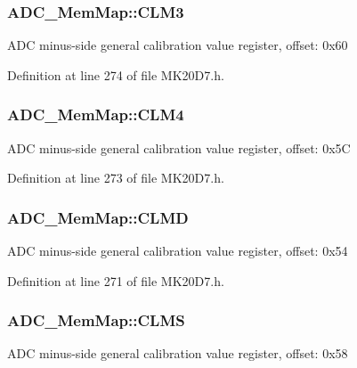 \subsubsection[{\texorpdfstring{C\+L\+M3}{CLM3}}]{ A\+D\+C\+\_\+\+Mem\+Map\+::\+C\+L\+M3}\hypertarget{struct_a_d_c___mem_map_a326c171566746f11f9b808930253df85}{}\label{struct_a_d_c___mem_map_a326c171566746f11f9b808930253df85}
A\+DC minus-\/side general calibration value register, offset\+: 0x60 

Definition at line 274 of file M\+K20\+D7.\+h.

\subsubsection[{\texorpdfstring{C\+L\+M4}{CLM4}}]{ A\+D\+C\+\_\+\+Mem\+Map\+::\+C\+L\+M4}\hypertarget{struct_a_d_c___mem_map_a7b8d8ae0f052a3824d3b34dffdf471e0}{}\label{struct_a_d_c___mem_map_a7b8d8ae0f052a3824d3b34dffdf471e0}
A\+DC minus-\/side general calibration value register, offset\+: 0x5C 

Definition at line 273 of file M\+K20\+D7.\+h.

\subsubsection[{\texorpdfstring{C\+L\+MD}{CLMD}}]{ A\+D\+C\+\_\+\+Mem\+Map\+::\+C\+L\+MD}\hypertarget{struct_a_d_c___mem_map_ad78aef04412250c47f943c007ad2eed2}{}\label{struct_a_d_c___mem_map_ad78aef04412250c47f943c007ad2eed2}
A\+DC minus-\/side general calibration value register, offset\+: 0x54 

Definition at line 271 of file M\+K20\+D7.\+h.

\subsubsection[{\texorpdfstring{C\+L\+MS}{CLMS}}]{ A\+D\+C\+\_\+\+Mem\+Map\+::\+C\+L\+MS}\hypertarget{struct_a_d_c___mem_map_ad4519a320afe549d5b275b534be9bc39}{}\label{struct_a_d_c___mem_map_ad4519a320afe549d5b275b534be9bc39}
A\+DC minus-\/side general calibration value register, offset\+: 0x58 

